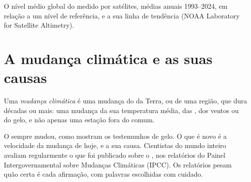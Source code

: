 \begin{omfigure}

{\small O nível médio global do  medido por satélites, médias anuais
1993--2024, em relação a um nível de referência, e a sua linha de
tendência (NOAA Laboratory for Satellite Altimetry).}
\label{fig:g9:climate-past-and-present:sea}
\end{omfigure}

\section{A mudança climática e as suas causas}

\begin{definition}\label{def:g9:climate-past-and-present:climate-change}
Uma \emph{mudança climática} é uma mudança do
 da Terra, ou de uma região, que dura décadas ou mais: uma mudança da
sua temperatura média, das , dos ventos ou do gelo, e não apenas
uma estação fora do comum.
\end{definition}

O  sempre mudou, como mostram os testemunhos de gelo. O que é novo é
a velocidade da mudança de hoje, e a sua causa. Cientistas do mundo
inteiro avaliam regularmente o que foi publicado sobre o , nos
relatórios do Painel Intergovernamental sobre Mudanças Climáticas (IPCC).
Os relatórios pesam quão certa é cada afirmação, com palavras escolhidas
com cuidado.

